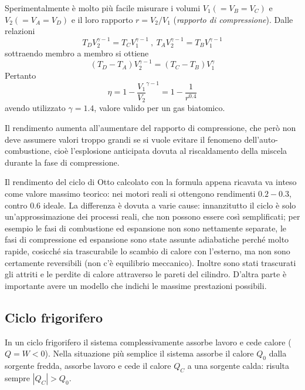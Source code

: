 \documentclass[class=book, crop=false, oneside, 12pt]{standalone}
\begin{document}
Sperimentalmente è molto più facile misurare i volumi \(V_1 (= V_B = V_C)\) e \(V_2 (= V_A = V_D)\) e il loro rapporto \(r = V_2 / V_1\) (\emph{rapporto di compressione}). 
Dalle relazioni 
\begin{equation*}
    T_D V_2^{\gamma - 1} = T_C V_1^{\gamma - 1} \ , \ T_A V_2^{\gamma - 1} = T_B V_1^{\gamma - 1} 
\end{equation*}
sottraendo membro a membro si ottiene
\begin{equation*}
    \left(T_D - T_A\right) V_2^{\gamma - 1} = \left(T_C - T_B \right) V_1^{\gamma}
\end{equation*}
Pertanto
\begin{equation*}
    \eta = 1 - \frac{V_1}{V_2}^{\gamma - 1} = 1 - \frac{1}{r^{0.4}}
\end{equation*}
avendo utilizzato \(\gamma = 1.4\), valore valido per un gas biatomico.

Il rendimento aumenta all'aumentare del rapporto di compressione, che però non deve assumere valori troppo grandi se si vuole evitare il fenomeno dell'auto-combustione, cioè l'esplosione anticipata dovuta al riscaldamento della miscela durante la fase di compressione. 

Il rendimento del ciclo di Otto calcolato con la formula appena ricavata va inteso come valore massimo teorico: nei motori reali si ottengono rendimenti \(0.2 - 0.3\), contro \(0.6\) ideale. 
La differenza è dovuta a varie cause: innanzitutto il ciclo è solo un'approssimazione dei processi reali, che non possono essere così semplificati; per esempio le fasi di combustione ed espansione non sono nettamente separate, le fasi di compressione ed espansione sono state assunte adiabatiche perché molto rapide, cosicché sia trascurabile lo scambio di calore con l'esterno, ma non sono certamente reversibili (non c'è equilibrio meccanico). 
Inoltre sono stati trascurati gli attriti e le perdite di calore attraverso le pareti del cilindro. 
D'altra parte è importante avere un modello che indichi le massime prestazioni possibili.

\subsection{Ciclo frigorifero}

In un ciclo frigorifero il sistema complessivamente assorbe lavoro e cede calore (\(Q = W < 0\)). 
Nella situazione più semplice il sistema assorbe il calore \(Q_0\) dalla sorgente fredda, assorbe lavoro e cede il calore \(Q_C\) a una sorgente calda: risulta sempre \(|Q_C| > Q_0\).
\end{document}
